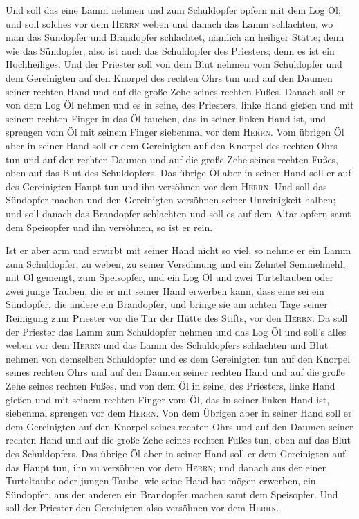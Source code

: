  Und soll das eine Lamm nehmen und zum Schuldopfer opfern
mit dem Log Öl; und soll solches vor dem \textsc{Herrn} weben
 und danach das Lamm schlachten, wo man das Sündopfer und
Brandopfer schlachtet, nämlich an heiliger Stätte; denn wie das
Sündopfer, also ist auch das Schuldopfer des Priesters; denn es ist ein
Hochheiliges.  Und der Priester soll von dem Blut nehmen
vom Schuldopfer und dem Gereinigten auf den Knorpel des rechten Ohrs tun
und auf den Daumen seiner rechten Hand und auf die große Zehe seines
rechten Fußes.  Danach soll er von dem Log Öl nehmen und
es in seine, des Priesters, linke Hand gießen  und mit
seinem rechten Finger in das Öl tauchen, das in seiner linken Hand ist,
und sprengen vom Öl mit seinem Finger siebenmal vor dem \textsc{Herrn}.
 Vom übrigen Öl aber in seiner Hand soll er dem
Gereinigten auf den Knorpel des rechten Ohrs tun und auf den rechten
Daumen und auf die große Zehe seines rechten Fußes, oben auf das Blut
des Schuldopfers.  Das übrige Öl aber in seiner Hand soll
er auf des Gereinigten Haupt tun und ihn versöhnen vor dem
\textsc{Herrn}.  Und soll das Sündopfer machen und den
Gereinigten versöhnen seiner Unreinigkeit halben; und soll danach das
Brandopfer schlachten  und soll es auf dem Altar opfern
samt dem Speisopfer und ihn versöhnen, so ist er rein.

 Ist er aber arm und erwirbt mit seiner Hand nicht so
viel, so nehme er ein Lamm zum Schuldopfer, zu weben, zu seiner
Versöhnung und ein Zehntel Semmelmehl, mit Öl gemengt, zum Speisopfer,
und ein Log Öl  und zwei Turteltauben oder zwei junge
Tauben, die er mit seiner Hand erwerben kann, dass eine sei ein
Sündopfer, die andere ein Brandopfer,  und bringe sie am
achten Tage seiner Reinigung zum Priester vor die Tür der Hütte des
Stifts, vor den \textsc{Herrn}.  Da soll der Priester das
Lamm zum Schuldopfer nehmen und das Log Öl und soll's alles weben vor
dem \textsc{Herrn}  und das Lamm des Schuldopfers
schlachten und Blut nehmen von demselben Schuldopfer und es dem
Gereinigten tun auf den Knorpel seines rechten Ohrs und auf den Daumen
seiner rechten Hand und auf die große Zehe seines rechten Fußes,
 und von dem Öl in seine, des Priesters, linke Hand
gießen  und mit seinem rechten Finger vom Öl, das in
seiner linken Hand ist, siebenmal sprengen vor dem \textsc{Herrn}.
 Von dem Übrigen aber in seiner Hand soll er dem
Gereinigten auf den Knorpel seines rechten Ohrs und auf den Daumen
seiner rechten Hand und auf die große Zehe seines rechten Fußes tun,
oben auf das Blut des Schuldopfers.  Das übrige Öl aber
in seiner Hand soll er dem Gereinigten auf das Haupt tun, ihn zu
versöhnen vor dem \textsc{Herrn};  und danach aus der
einen Turteltaube oder jungen Taube, wie seine Hand hat mögen erwerben,
 ein Sündopfer, aus der anderen ein Brandopfer machen
samt dem Speisopfer. Und soll der Priester den Gereinigten also
versöhnen vor dem \textsc{Herrn}.

